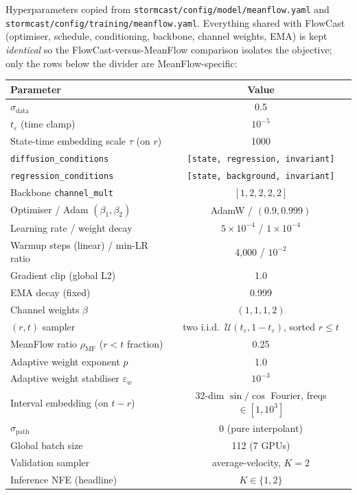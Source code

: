 Hyperparameters copied from \texttt{stormcast/config/model/meanflow.yaml} and \texttt{stormcast/config/training/meanflow.yaml}. Everything shared with FlowCast (optimiser, schedule, conditioning, backbone, channel weights, EMA) is kept \emph{identical} so the FlowCast-versus-MeanFlow comparison isolates the objective; only the rows below the divider are MeanFlow-specific:
\begin{center}
\begin{tabular}{lc}
\toprule
Parameter & Value \\
\midrule
$\sigma_{\text{data}}$ & 0.5 \\
$t_\varepsilon$ (time clamp) & $10^{-5}$ \\
State-time embedding scale $\tau$ (on $r$) & 1000 \\
\texttt{diffusion\_conditions} & \texttt{[state, regression, invariant]} \\
\texttt{regression\_conditions} & \texttt{[state, background, invariant]} \\
Backbone \texttt{channel\_mult} & $[1, 2, 2, 2, 2]$ \\
Optimiser / Adam $(\beta_1, \beta_2)$ & AdamW / $(0.9, 0.999)$ \\
Learning rate / weight decay & $5 \times 10^{-4}$ / $1 \times 10^{-4}$ \\
Warmup steps (linear) / min-LR ratio & 4{,}000 / $10^{-2}$ \\
Gradient clip (global L2) & 1.0 \\
EMA decay (fixed) & 0.999 \\
Channel weights $\beta$ & $(1, 1, 1, 2)$ \\
\midrule
$(r, t)$ sampler & two i.i.d.\ $\mathcal{U}(t_\varepsilon, 1 - t_\varepsilon)$, sorted $r \le t$ \\
MeanFlow ratio $\rho_{\text{MF}}$ ($r < t$ fraction) & 0.25 \\
Adaptive weight exponent $p$ & 1.0 \\
Adaptive weight stabiliser $\varepsilon_w$ & $10^{-3}$ \\
Interval embedding (on $t - r$) & 32-dim $\sin/\cos$ Fourier, freqs $\in [1, 10^{3}]$ \\
$\sigma_{\text{path}}$ & 0 (pure interpolant) \\
Global batch size & 112 (7 GPUs) \\
Validation sampler & average-velocity, $K = 2$ \\
Inference NFE (headline) & $K \in \{1, 2\}$ \\
\bottomrule
\end{tabular}
\end{center}

